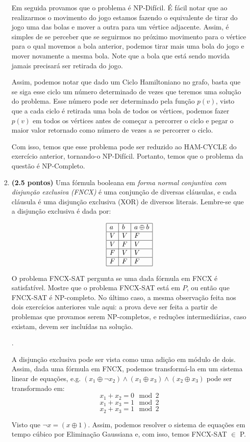 \documentclass[12pt]{article}
\newcommand{\resposta}[1]{ \noindent {\bf Solução}.{\color{blue} #1}}
\begin{document}
\begin{enumerate}
{    Em seguida provamos que o problema é NP-Difícil. É fácil notar que
    ao realizarmos o movimento do jogo estamos fazendo o equivalente de
    tirar do jogo uma das bolas e mover a outra para um vértice adjacente.
    Assim, é simples de se perceber que se seguirmos no próximo movimento
    para o vértice para o qual movemos a bola anterior, podemos tirar
    mais uma bola do jogo e mover novamente a mesma bola. Note que a
    bola que está sendo movida jamais precisará ser retirada do jogo.

    Assim, podemos notar que dado um Ciclo Hamiltoniano no grafo, basta que
    se siga esse ciclo um número determinado de vezes que teremos uma solução
    do problema. Esse número pode ser determinado pela função $p(v)$, visto que
    a cada ciclo é retirada uma bola de todos os vértices, podemos fazer
    $p(v)$ em todos os vértices antes de começar a percorrer o ciclo
    e pegar o maior valor retornado como número de vezes a se percorrer
    o ciclo.

    Com isso, temos que esse problema pode ser reduzido ao HAM-CYCLE do
    exercício anterior, tornando-o NP-Difícil. Portanto, temos que o
    problema da questão é NP-Completo.
  }
  
\item {\bf (2.5 pontos)} Uma fórmula booleana em {\it forma normal conjuntiva com disjunção exclusiva (FNCX)} é uma conjunção de diversas cláusulas, e cada cláusula é uma disjunção exclusiva (XOR) de diversos literais. Lembre-se que a disjunção exclusiva é dada por:

  $$\begin{array}{|l|l|l|}\hline
  a & b & a \oplus b \\ \hline
  V & V & F \\ \hline
  V & F & V \\ \hline
  F & V & V \\ \hline
  F & F & F \\ \hline
\end{array}$$

  O problema FNCX-SAT pergunta se uma dada fórmula em FNCX é
  satisfatível. Mostre que o problema FNCX-SAT está em $P$, ou então
  que FNCX-SAT é NP-completo. No último caso, a mesma observação feita
  nos dois exercícios anteriores vale aqui: a prova deve ser feita a
  partir de problemas que provamos serem NP-completos, e reduções
  intermediárias, caso existam, devem ser incluídas na solução.

  \resposta{
    A disjunção exclusiva pode ser vista como uma adição em módulo de dois.
    Assim, dada uma fórmula em FNCX, podemos transformá-la em um sistema
    linear de equações, e.g. $(x_1 \oplus \neg x_2) \land (x_1 \oplus x_3)
    \land (x_2 \oplus x_3)$ pode ser transformado em:
    $$x_1 + x_2 = 0 \mod 2$$
    $$x_1 + x_3 = 1 \mod 2$$
    $$x_2 + x_3 = 1 \mod 2$$

    Visto que $\neg x = (x \oplus 1)$. Assim, podemos resolver o sistema
    de equações em tempo cúbico por Eliminação Gaussiana e, com isso,
    temos FNCX-SAT $\in$ P.
  }
\end{enumerate}
\end{document}
